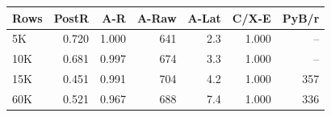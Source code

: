 \begin{tabular}{lrrrrrr}
\toprule
Rows & PostR & A-R & A-Raw & A-Lat & C/X-E & PyB/r\\
\midrule
5K & 0.720 & 1.000 & 641 & 2.3 & 1.000 & --\\
10K & 0.681 & 0.997 & 674 & 3.3 & 1.000 & --\\
15K & 0.451 & 0.991 & 704 & 4.2 & 1.000 & 357\\
60K & 0.521 & 0.967 & 688 & 7.4 & 1.000 & 336\\
\bottomrule
\end{tabular}